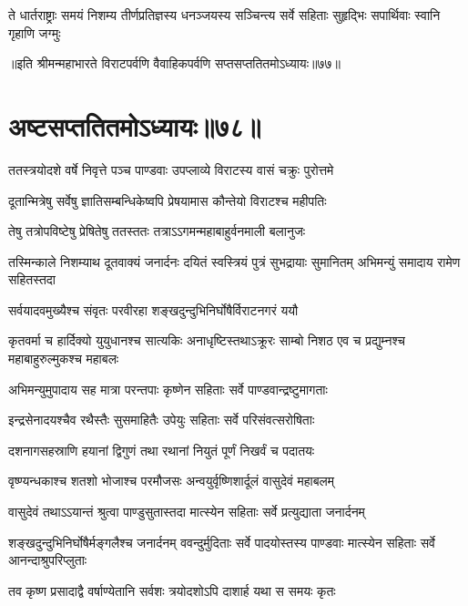 \fourlineindentedshloka
{ते धार्तराष्ट्राः समयं निशम्य}
{तीर्णप्रतिज्ञस्य धनञ्जयस्य }
{सञ्चिन्त्य सर्वे सहिताः सुहृद्भिः}
{सपार्थिवाः स्वानि गृहाणि जग्मुः}

॥इति श्रीमन्महाभारते विराटपर्वणि वैवाहिकपर्वणि सप्तसप्ततितमोऽध्यायः॥७७॥

\chapter{अष्टसप्ततितमोऽध्यायः॥७८॥ }

\twolineshloka
{ततस्त्रयोदशे वर्षे निवृत्ते पञ्च पाण्डवाः}
{उपप्लाव्ये विराटस्य वासं चक्रुः पुरोत्तमे}


\twolineshloka
{दूतान्मित्रेषु सर्वेषु ज्ञातिसम्बन्धिकेष्वपि}
{प्रेषयामास कौन्तेयो विराटश्च महीपतिः}


\twolineshloka
{तेषु तत्रोपविष्टेषु प्रेषितेषु ततस्ततः}
{तत्राऽऽगमन्महाबाहुर्वनमाली बलानुजः}


\threelineshloka
{तस्मिन्काले निशम्याथ दूतवाक्यं जनार्दनः}
{दयितं स्वस्त्रियं पुत्रं सुभद्रायाः सुमानितम्}
{अभिमन्युं समादाय रामेण सहितस्तदा}


\twolineshloka
{सर्वयादवमुख्यैश्च संवृतः परवीरहा}
{शङ्खदुन्दुभिनिर्घोषैर्विराटनगरं ययौ}


\threelineshloka
{कृतवर्मा च हार्दिक्यो युयुधानश्च सात्यकिः}
{अनाधृष्टिस्तथाऽक्रूरः साम्बो निशठ एव च}
{प्रद्युम्नश्च महाबाहुरुल्मुकश्च महाबलः}


\twolineshloka
{अभिमन्युमुपादाय सह मात्रा परन्तपाः}
{कृष्णेन सहिताः सर्वे पाण्डवान्द्रष्टुमागताः}


\twolineshloka
{इन्द्रसेनादयश्चैव रथैस्तैः सुसमाहितैः}
{उपेयुः सहिताः सर्वे परिसंवत्सरोषिताः}


\twolineshloka
{दशनागसहस्राणि हयानां द्विगुणं तथा}
{रथानां नियुतं पूर्णं निखर्वं च पदातयः}


\twolineshloka
{वृष्ण्यन्धकाश्च शतशो भोजाश्च परमौजसः}
{अन्वयुर्वृष्णिशार्दूलं वासुदेवं महाबलम्}


\twolineshloka
{वासुदेवं तथाऽऽयान्तं श्रुत्वा पाण्डुसुतास्तदा}
{मात्स्येन सहिताः सर्वे प्रत्युद्याता जनार्दनम्}


\threelineshloka
{शङ्खदुन्दुभिनिर्घोषैर्मङ्गलैश्च जनार्दनम्}
{ववन्दुर्मुदिताः सर्वे पादयोस्तस्य पाण्डवाः}
{मात्स्येन सहिताः सर्वे आनन्दाश्रुपरिप्लुताः}


\twolineshloka
{तव कृष्ण प्रसादाद्वै वर्षाण्येतानि सर्वशः}
{त्रयोदशोऽपि दाशार्ह यथा स समयः कृतः}


